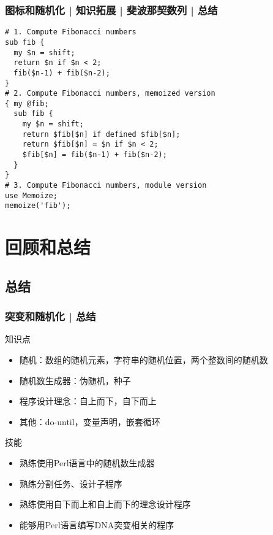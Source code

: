 \begin{frame}[fragile]
  \frametitle{图标和随机化 | 知识拓展 | 斐波那契数列 | 总结}
  \begin{lstlisting}[basicstyle=\small\tt]
# 1. Compute Fibonacci numbers
sub fib {
  my $n = shift;
  return $n if $n < 2;
  fib($n-1) + fib($n-2);
}
# 2. Compute Fibonacci numbers, memoized version
{ my @fib;
  sub fib {
    my $n = shift;
    return $fib[$n] if defined $fib[$n];
    return $fib[$n] = $n if $n < 2;
    $fib[$n] = fib($n-1) + fib($n-2);
  }
}
# 3. Compute Fibonacci numbers, module version
use Memoize;
memoize('fib');
\end{lstlisting}
\end{frame}

\section{回顾和总结}
\subsection{总结}
\begin{frame}
  \frametitle{突变和随机化 | 总结}
  \begin{block}{知识点}
    \begin{itemize}
      \item 随机：数组的随机元素，字符串的随机位置，两个整数间的随机数
      \item 随机数生成器：伪随机，种子
      \item 程序设计理念：自上而下，自下而上
      \item 其他：do-until，变量声明，嵌套循环
    \end{itemize}
  \end{block}
  \pause
  \begin{block}{技能}
    \begin{itemize}
      \item 熟练使用Perl语言中的随机数生成器
      \item 熟练分割任务、设计子程序
      \item 熟练使用自下而上和自上而下的理念设计程序
      \item 能够用Perl语言编写DNA突变相关的程序
    \end{itemize}
  \end{block}
\end{frame}

